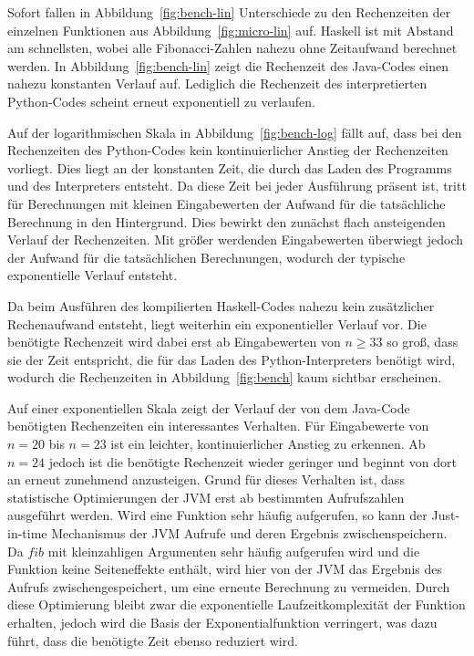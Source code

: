 \documentclass[11pt, parskip=half]{scrartcl}       %
\begin{document}
Sofort fallen in Abbildung~\ref{fig:bench-lin} Unterschiede zu den Rechenzeiten der einzelnen Funktionen aus Abbildung~\ref{fig:micro-lin} auf.
Haskell ist mit Abstand am schnellsten, wobei alle Fibonacci-Zahlen nahezu ohne Zeitaufwand berechnet werden.
In Abbildung~\ref{fig:bench-lin} zeigt die Rechenzeit des Java-Codes einen nahezu konstanten Verlauf auf.
Lediglich die Rechenzeit des interpretierten Python-Codes scheint erneut exponentiell zu verlaufen.

Auf der logarithmischen Skala in Abbildung~\ref{fig:bench-log} fällt auf, dass bei den Rechenzeiten des Python-Codes kein kontinuierlicher Anstieg der Rechenzeiten vorliegt.
Dies liegt an der konstanten Zeit, die durch das Laden des Programms und des Interpreters entsteht.
Da diese Zeit bei jeder Ausführung präsent ist, tritt für Berechnungen mit kleinen Eingabewerten der Aufwand für die tatsächliche Berechnung in den Hintergrund.
Dies bewirkt den zunächst flach ansteigenden Verlauf der Rechenzeiten.
Mit größer werdenden Eingabewerten überwiegt jedoch der Aufwand für die tatsächlichen Berechnungen, wodurch der typische exponentielle Verlauf entsteht.

Da beim Ausführen des kompilierten Haskell-Codes nahezu kein zusätzlicher Rechenaufwand entsteht, liegt weiterhin ein exponentieller Verlauf vor.
Die benötigte Rechenzeit wird dabei erst ab Eingabewerten von $n \ge 33$ so groß, dass sie der Zeit entspricht, die für das Laden des Python-Interpreters benötigt wird, wodurch die Rechenzeiten in Abbildung~\ref{fig:bench} kaum sichtbar erscheinen.

Auf einer exponentiellen Skala zeigt der Verlauf der von dem Java-Code benötigten Rechenzeiten
ein interessantes Verhalten.
Für Eingabewerte von $n = 20$ bis $n = 23$ ist ein leichter, kontinuierlicher Anstieg zu erkennen.
Ab $n = 24$ jedoch ist die benötigte Rechenzeit wieder geringer und beginnt von dort an erneut zunehmend anzusteigen.
Grund für dieses Verhalten ist, dass statistische Optimierungen der JVM erst ab bestimmten Aufrufszahlen ausgeführt werden.
Wird eine Funktion sehr häufig aufgerufen, so kann der Just-in-time Mechanismus der JVM Aufrufe und deren Ergebnis zwischenspeichern.
Da $fib$ mit kleinzahligen Argumenten sehr häufig aufgerufen wird und die Funktion keine Seiteneffekte enthält, wird hier von der JVM das Ergebnis des Aufrufs zwischengespeichert, um eine erneute Berechnung zu vermeiden.
Durch diese Optimierung bleibt zwar die exponentielle Laufzeitkomplexität der Funktion erhalten, jedoch wird die Basis der Exponentialfunktion verringert, was dazu führt, dass die benötigte Zeit ebenso reduziert wird.
\end{document}
